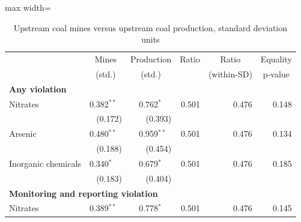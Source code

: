 \begin{table}[htbp]
\raggedright
\begin{minipage}{\linewidth}
\caption{\label{tab:scaled_compare_sd_k2} Upstream coal mines versus upstream coal production, standard deviation units}
\end{minipage}
\small
{\setlength{\tabcolsep}{4pt}%
\begin{adjustbox}{max width=\linewidth}
\begin{tabular}{lrrrrr}
\toprule
 & \multicolumn{1}{c}{Mines} & \multicolumn{1}{c}{Production} & \multicolumn{1}{c}{Ratio} & \multicolumn{1}{c}{Ratio} & \multicolumn{1}{c}{Equality} \\
 & \multicolumn{1}{c}{(std.)} & \multicolumn{1}{c}{(std.)} & \multicolumn{1}{c}{} & \multicolumn{1}{c}{(within-SD)} & \multicolumn{1}{c}{p-value} \\
\hline
\multicolumn{6}{l}{\textbf{Any violation}} \\
Nitrates & \phantom{(}\phantom{-}0.382$^{**\phantom{*}}$ & \phantom{(}\phantom{-}0.762$^{*\phantom{*}\phantom{*}}$ & \phantom{(}\phantom{-}0.501\phantom{$^{***}$} & \phantom{(}\phantom{-}0.476\phantom{$^{***}$} & \phantom{(}\phantom{-}0.148\phantom{$^{***}$} \\
 & (\phantom{-}0.172)\phantom{$^{***}$} & (\phantom{-}0.393)\phantom{$^{***}$} &  &  &  \\
Arsenic & \phantom{(}\phantom{-}0.480$^{**\phantom{*}}$ & \phantom{(}\phantom{-}0.959$^{**\phantom{*}}$ & \phantom{(}\phantom{-}0.501\phantom{$^{***}$} & \phantom{(}\phantom{-}0.476\phantom{$^{***}$} & \phantom{(}\phantom{-}0.134\phantom{$^{***}$} \\
 & (\phantom{-}0.188)\phantom{$^{***}$} & (\phantom{-}0.454)\phantom{$^{***}$} &  &  &  \\
Inorganic chemicals & \phantom{(}\phantom{-}0.340$^{*\phantom{*}\phantom{*}}$ & \phantom{(}\phantom{-}0.679$^{*\phantom{*}\phantom{*}}$ & \phantom{(}\phantom{-}0.501\phantom{$^{***}$} & \phantom{(}\phantom{-}0.476\phantom{$^{***}$} & \phantom{(}\phantom{-}0.185\phantom{$^{***}$} \\
 & (\phantom{-}0.183)\phantom{$^{***}$} & (\phantom{-}0.404)\phantom{$^{***}$} &  &  &  \\
\multicolumn{6}{l}{\textbf{Monitoring and reporting violation}} \\
Nitrates & \phantom{(}\phantom{-}0.389$^{**\phantom{*}}$ & \phantom{(}\phantom{-}0.778$^{*\phantom{*}\phantom{*}}$ & \phantom{(}\phantom{-}0.501\phantom{$^{***}$} & \phantom{(}\phantom{-}0.476\phantom{$^{***}$} & \phantom{(}\phantom{-}0.145\phantom{$^{***}$} \\

\end{tabular}
\end{adjustbox}}
\end{table}
